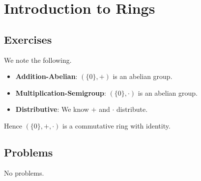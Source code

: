 \section{Introduction to Rings}
\subsection*{Exercises}
\begin{questions}
    \item We note the following.
    \begin{itemize}
        \item \textbf{Addition-Abelian}: $(\{0\}, +)$ is an abelian group.
        \item \textbf{Multiplication-Semigroup}: $(\{0\}, \cdot)$ is an abelian group.
        \item \textbf{Distributive}: We know $+$ and $\cdot$ distribute.
    \end{itemize}
    Hence $(\{0\}, +, \cdot)$ is a commutative ring with identity.
\end{questions}

\subsection*{Problems}
No problems.
